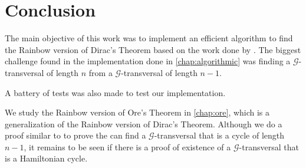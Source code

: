 
\chapter{Conclusion}

The main objective of this work was to implement an efficient algorithm to find
the Rainbow version of Dirac's Theorem based on the work done by \cite{Joos_2020}.
The biggest challenge found in the implementation done in \autoref{chap:algorithmic} was 
finding a $\mathcal{G}$-transversal of length $n$ from a $\mathcal{G}$-transversal of length $n - 1$.

A battery of tests was also made to test our implementation.

We study the Rainbow version of Ore's Theorem in \autoref{chap:ore}, which is a generalization of
the Rainbow version of Dirac's Theorem. Although we do a proof similar
to \cite{Joos_2020} to prove the can find a 
$ \mathcal{G} $-transversal that is a cycle of length $ n - 1 $, it remains
to be seen if there is a proof of existence of a 
$ \mathcal{G} $-transversal that is a Hamiltonian cycle.